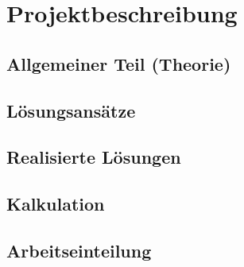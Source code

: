 

\chapter{Projektbeschreibung}


\section{Allgemeiner Teil (Theorie)}


\section{Lösungsansätze}

\section{Realisierte Lösungen}

\section{Kalkulation}

\section{Arbeitseinteilung}